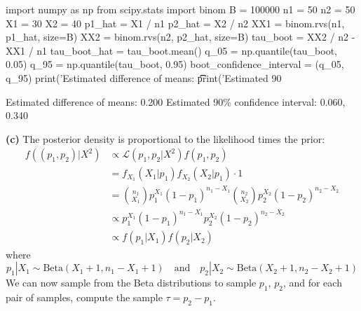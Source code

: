 \begin{python}
import numpy as np
from scipy.stats import binom
B = 100000
n1 = 50
n2 = 50
X1 = 30
X2 = 40
p1_hat = X1 / n1
p2_hat = X2 / n2
XX1 = binom.rvs(n1, p1_hat, size=B)
XX2 = binom.rvs(n2, p2_hat, size=B)
tau_boot = XX2 / n2 - XX1 / n1
tau_boot_hat = tau_boot.mean()
q_05 = np.quantile(tau_boot, 0.05)
q_95 = np.quantile(tau_boot, 0.95)
boot_confidence_interval = (q_05, q_95)
print('Estimated difference of means: \t\t %
print('Estimated 90%
\end{python}
\begin{console}
Estimated difference of means:           0.200
Estimated 90\% confidence interval:       0.060, 0.340
\end{console}
\textbf{(c)} The posterior density is proportional to the likelihood
times the prior:
\begin{align*}
f((p_{1}, p_{2}) | X^{2}) &\propto \mathcal{L}(p_{1}, p_{2} | X^{2}) f(p_{1}, p_{2}) \\
&= f_{X_{1}}(X_{1} | p_{1}) f_{X_{2}}(X_{2} | p_{1}) \cdot 1 \\
&= \binom{n_{1}}{X_{1}} p_{1}^{X_{1}} (1 - p_{1})^{n_{1} - X_{1}} \binom{n_{2}}{X_{2}} p_{2}^{X_{2}} (1 - p_{2})^{n_{2} - X_{2}} \\
&\propto p_{1}^{X_{1}} (1 - p_{1})^{n_{1} - X_{1}} p_{2}^{X_{2}} (1 - p_{2})^{n_{2} - X_{2}} \\
&\propto f(p_{1} | X_{1}) f(p_{2} | X_{2})
\end{align*}
where
\[
p_{1} | X_{1} \sim \text{Beta}(X_{1} + 1, n_{1} - X_{1} + 1) 
\quad \text{and} \quad
p_{2} | X_{2} \sim \text{Beta}(X_{2} + 1, n_{2} - X_{2} + 1)
\]
We can now sample from the Beta distributions to sample \(p_{1}\),
\(p_{2}\), and for each pair of samples, compute the sample
\(\tau = p_{2} - p_{1}\).


